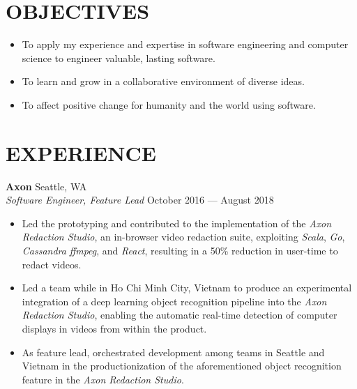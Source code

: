 \documentclass[line,margin]{res}
\begin{document}
\address{wilsoniya@gmail.com}
\address{(312) 404--0425}

\begin{resume}


\section{OBJECTIVES}
    \begin{itemize} \itemsep -2pt
        \item To apply my experience and expertise in software engineering and
            computer science to engineer valuable, lasting software.
        \item To learn and grow in a collaborative environment of diverse
            ideas.
        \item To affect positive change for humanity and the world using
            software.
    \end{itemize}


\section{EXPERIENCE}
    \textbf{Axon} \hfill Seattle, WA \\
    \textit{Software Engineer, Feature Lead}
    \hfill October 2016 --- August 2018
        \begin{itemize}  \itemsep -2pt
            \item Led the prototyping and contributed to the implementation of
                the \textit{Axon Redaction Studio}, an in-browser video
                redaction suite, exploiting \textit{Scala}, \textit{Go},
                \textit{Cassandra} \textit{ffmpeg}, and \textit{React},
                resulting in a 50\% reduction in user-time to redact videos.
            \item Led a team while in Ho Chi Minh City, Vietnam to produce an
                experimental integration of a deep learning object recognition
                pipeline into the \textit{Axon Redaction Studio}, enabling the
                automatic real-time detection of computer displays in videos
                from within the product.
            \item As feature lead, orchestrated development among teams in
                Seattle and Vietnam in the productionization of the
                aforementioned object recognition feature in the \textit{Axon
                Redaction Studio}.
        \end{itemize}


\end{resume}
\end{document}
